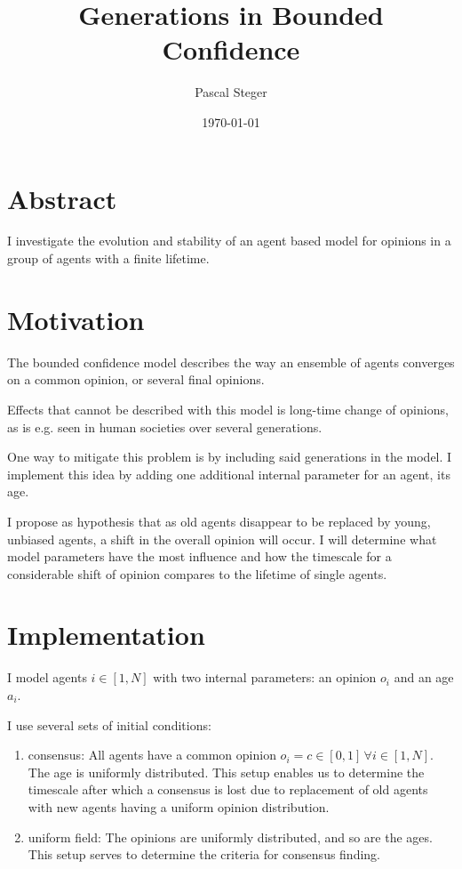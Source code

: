 \documentclass[11pt]{article}
\author{Pascal Steger}
\date{\today}
\title{Generations in Bounded Confidence}
\begin{document}
\maketitle
\tableofcontents


\section{Abstract}
\label{sec-1}
I investigate the evolution and stability of an
agent based model for opinions in a group of agents with a
finite lifetime.
\section{Motivation}
\label{sec-2}
The bounded confidence model describes the way an ensemble of agents
converges on a common opinion, or several final opinions.

Effects that cannot be described with this model is long-time change
of opinions, as is e.g. seen in human societies over several
generations.

One way to mitigate this problem is by including said generations in the
model. I implement this idea by adding one additional internal
parameter for an agent, its age.

I propose as hypothesis that as old agents disappear to be
replaced by young, unbiased agents, a shift in the overall opinion
will occur. I will determine what model parameters have the most
influence and how the timescale for a considerable shift of opinion
compares to the lifetime of single agents.
\section{Implementation}
\label{sec-3}
I model agents $i\in[1,N]$ with two internal parameters: an opinion
$o_i$ and an age $a_i$.

I use several sets of initial conditions:

\begin{enumerate}
\item consensus: All agents have a common opinion $o_i=c\in[0,1]\,\forall
   i\in[1,N]$. The age is uniformly distributed. This setup enables us
to determine the timescale after which a consensus is lost due to
replacement of old agents with new agents having a uniform opinion
distribution.

\item uniform field: The opinions are uniformly distributed, and so are the
ages. This setup serves to determine the criteria for consensus
finding.
\end{enumerate}
\end{document}
